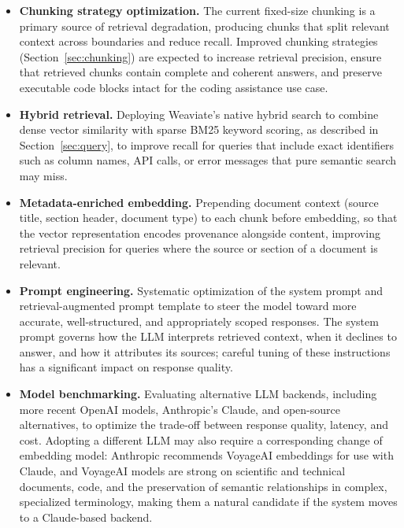 \begin{itemize}

\item\textbf{Chunking strategy optimization.}
The current fixed-size chunking is a primary source of retrieval degradation, producing chunks that split relevant context across boundaries and reduce recall. Improved chunking strategies (Section~\ref{sec:chunking}) are expected to increase retrieval precision, ensure that retrieved chunks contain complete and coherent answers, and preserve executable code blocks intact for the coding assistance use case.

\item\textbf{Hybrid retrieval.}
Deploying Weaviate's native hybrid search to combine dense vector similarity with sparse BM25 keyword scoring, as described in Section~\ref{sec:query}, to improve recall for queries that include exact identifiers such as column names, API calls, or error messages that pure semantic search may miss.

\item\textbf{Metadata-enriched embedding.}
Prepending document context (source title, section header, document type) to each chunk before embedding, so that the vector representation encodes provenance alongside content, improving retrieval precision for queries where the source or section of a document is relevant.

\item\textbf{Prompt engineering.}
Systematic optimization of the system prompt and retrieval-augmented prompt template to steer the model toward more accurate, well-structured, and appropriately scoped responses.
The system prompt governs how the LLM interprets retrieved context, when it declines to answer, and how it attributes its sources; careful tuning of these instructions has a significant impact on response quality.
 
\item\textbf{Model benchmarking.}
Evaluating alternative LLM backends, including more recent OpenAI models, Anthropic's Claude, and open-source alternatives, to optimize the trade-off between response quality, latency, and cost.
Adopting a different LLM may also require a corresponding change of embedding model: Anthropic recommends VoyageAI embeddings for use with Claude, and VoyageAI models are strong on scientific and technical documents, code, and the preservation of semantic relationships in complex, specialized terminology, making them a natural candidate if the system moves to a Claude-based backend.
 

\end{itemize}
